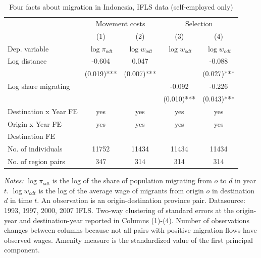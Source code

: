 \begin{table}[hbpt] \begin{center}\begin{threeparttable}\caption{ {Four facts about migration in Indonesia, IFLS data (self-employed only)    }} \begin{tabular}{l*{4}c} \toprule
&\multicolumn{2}{c}{Movement costs}&\multicolumn{2}{c}{Selection}\\
&(1)&(2)&(3)&(4)\\
Dep. variable&$\log \pi_{odt}$&$\log w_{odt}$ &$\log w_{odt}$ &$\log w_{odt}$ \\
\midrule
Log distance&-0.604&0.047&&-0.088\\
&(0.019)***&(0.007)***&&(0.027)***\\
Log share migrating&&&-0.092&-0.226\\
&&&(0.010)***&(0.043)***\\
\midrule
Destination x Year FE&yes&yes&yes&yes\\
Origin x Year FE&yes&yes&yes&yes\\
Destination FE&&&&\\
No. of individuals&11752&11434&11434&11434\\
No. of region pairs&347&314&314&314\\
\bottomrule \end{tabular} \label{Four facts about migration in Indonesia, IFLS data (self-employed only)    } \begin{tablenotes} \item {\footnotesize \emph{Notes: } $\log \pi_{odt}$ is the log of the share of population migrating from $ o $ to $ d $ in year $ t $. $\log w_{odt}$ is the log of the average wage of migrants from origin $ o $ in destination $ d $ in time $ t $. An observation is an origin-destination province pair. Datasource: 1993, 1997, 2000, 2007 IFLS. Two-way clustering of standard errors at the origin-year and destination-year reported in Columns (1)-(4). Number of observations changes between columns because not all pairs with positive migration flows have observed wages. Amenity measure is the standardized value of the first principal component. } \end{tablenotes} \end{threeparttable} \end{center} \end{table}
